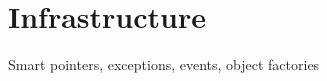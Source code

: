 \chapter{Infrastructure}
\label{chapter:Infrastructure}

Smart pointers, exceptions, events, object factories
